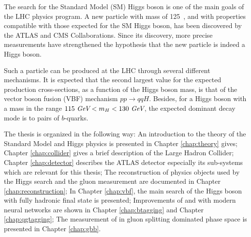 The search for the Standard Model (SM) Higgs boson\cite{Englert:1964et,Higgs:1964pj,Higgs:1964ia,Guralnik:1964eu}  is one of the main goals of the LHC physics program.  A new particle with mass of 125~\gev, and with  properties  compatible with those expected for the SM Higgs boson, has been discovered by the ATLAS\cite{HIGG-2012-27} and CMS\cite{CMS-HIG-12-028} Collaborations. Since its discovery, more precise measurements have strengthened the hypothesis that the new particle is indeed a Higgs boson\cite{HIGG-2013-02,HIGG-2014-06,HIGG-2014-14,CMS-HIG-12-036,CMS-HIG-12-041}.

Such a particle can be produced at the LHC through several different mechanisms. It is expected that the second largest value for the expected production cross-sections\cite{Dittmaier:2011ti}, as a function of the Higgs boson mass, is that of the vector boson fusion (VBF) mechanism $pp\to qqH$. Besides, for a Higgs boson with a mass in the range $115~\textit{GeV} < m_{H} < 130~\textit{GeV}$, the expected dominant decay mode is to pairs of $b$-quarks.

The thesis is organized in the following way: An introduction to the theory of the Standard Model and Higgs physics is presented in Chapter \ref{chap:theory} gives; Chapter \ref{chap:collider} gives a brief description of the Large Hadron Collider; Chapter \ref{chap:detector} describes the ATLAS detector especially its sub-systems which are relevant for this thesis; The reconstruction of physics objects used by the Higgs search and the gluon measurement are documented in Chapter \ref{chap:reconstruction}; In Chapter \ref{chap:vbf}, the main search of the Higgs boson with fully hadronic final state is presented; Improvements of \btagging and \qgtagging with modern neural networks are shown in Chapter \ref{chap:btagging} and Chapter \ref{chap:qgtagging}; The measurement of \gbb in gluon splitting dominated phase space is presented in Chapter \ref{chap:gbb}.
